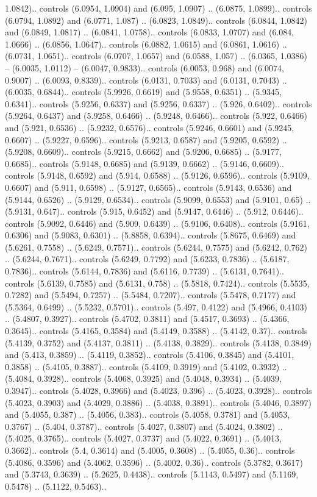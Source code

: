 1.0842).. controls (6.0954, 1.0904) and (6.095, 1.0907) .. (6.0875, 1.0899).. controls (6.0794, 1.0892) and (6.0771, 1.087) .. (6.0823, 1.0849).. controls (6.0844, 1.0842) and (6.0849, 1.0817) .. (6.0841, 1.0758).. controls (6.0833, 1.0707) and (6.084, 1.0666) .. (6.0856, 1.0647).. controls (6.0882, 1.0615) and (6.0861, 1.0616) .. (6.0731, 1.0651).. controls (6.0707, 1.0657) and (6.0588, 1.057) .. (6.0365, 1.0386) -- (6.0035, 1.0112) -- (6.0047, 0.9833).. controls (6.0053, 0.968) and (6.0074, 0.9007) .. (6.0093, 0.8339).. controls (6.0131, 0.7033) and (6.0131, 0.7043) .. (6.0035, 0.6844).. controls (5.9926, 0.6619) and (5.9558, 0.6351) .. (5.9345, 0.6341).. controls (5.9256, 0.6337) and (5.9256, 0.6337) .. (5.926, 0.6402).. controls (5.9264, 0.6437) and (5.9258, 0.6466) .. (5.9248, 0.6466).. controls (5.922, 0.6466) and (5.921, 0.6536) .. (5.9232, 0.6576).. controls (5.9246, 0.6601) and (5.9245, 0.6607) .. (5.9227, 0.6596).. controls (5.9213, 0.6587) and (5.9205, 0.6592) .. (5.9208, 0.6609).. controls (5.9215, 0.6662) and (5.9206, 0.6685) .. (5.9177, 0.6685).. controls (5.9148, 0.6685) and (5.9139, 0.6662) .. (5.9146, 0.6609).. controls (5.9148, 0.6592) and (5.914, 0.6588) .. (5.9126, 0.6596).. controls (5.9109, 0.6607) and (5.911, 0.6598) .. (5.9127, 0.6565).. controls (5.9143, 0.6536) and (5.9144, 0.6526) .. (5.9129, 0.6534).. controls (5.9099, 0.6553) and (5.9101, 0.65) .. (5.9131, 0.647).. controls (5.915, 0.6452) and (5.9147, 0.6446) .. (5.912, 0.6446).. controls (5.9092, 0.6446) and (5.909, 0.6439) .. (5.9106, 0.6408).. controls (5.9161, 0.6306) and (5.9083, 0.6301) .. (5.8858, 0.6394).. controls (5.8675, 0.6469) and (5.6261, 0.7558) .. (5.6249, 0.7571).. controls (5.6244, 0.7575) and (5.6242, 0.762) .. (5.6244, 0.7671).. controls (5.6249, 0.7792) and (5.6233, 0.7836) .. (5.6187, 0.7836).. controls (5.6144, 0.7836) and (5.6116, 0.7739) .. (5.6131, 0.7641).. controls (5.6139, 0.7585) and (5.6131, 0.758) .. (5.5818, 0.7424).. controls (5.5535, 0.7282) and (5.5494, 0.7257) .. (5.5484, 0.7207).. controls (5.5478, 0.7177) and (5.5364, 0.6499) .. (5.5232, 0.5701).. controls (5.497, 0.4122) and (5.4966, 0.4103) .. (5.4807, 0.3927).. controls (5.4702, 0.3811) and (5.4517, 0.3693) .. (5.4366, 0.3645).. controls (5.4165, 0.3584) and (5.4149, 0.3588) .. (5.4142, 0.37).. controls (5.4139, 0.3752) and (5.4137, 0.3811) .. (5.4138, 0.3829).. controls (5.4138, 0.3849) and (5.413, 0.3859) .. (5.4119, 0.3852).. controls (5.4106, 0.3845) and (5.4101, 0.3858) .. (5.4105, 0.3887).. controls (5.4109, 0.3919) and (5.4102, 0.3932) .. (5.4084, 0.3928).. controls (5.4068, 0.3925) and (5.4048, 0.3934) .. (5.4039, 0.3947).. controls (5.4028, 0.3966) and (5.4023, 0.396) .. (5.4023, 0.3928).. controls (5.4023, 0.3903) and (5.4029, 0.3886) .. (5.4038, 0.3891).. controls (5.4046, 0.3897) and (5.4055, 0.387) .. (5.4056, 0.383).. controls (5.4058, 0.3781) and (5.4053, 0.3767) .. (5.404, 0.3787).. controls (5.4027, 0.3807) and (5.4024, 0.3802) .. (5.4025, 0.3765).. controls (5.4027, 0.3737) and (5.4022, 0.3691) .. (5.4013, 0.3662).. controls (5.4, 0.3614) and (5.4005, 0.3608) .. (5.4055, 0.36).. controls (5.4086, 0.3596) and (5.4062, 0.3596) .. (5.4002, 0.36).. controls (5.3782, 0.3617) and (5.3743, 0.3639) .. (5.2625, 0.4438).. controls (5.1143, 0.5497) and (5.1169, 0.5478) .. (5.1122, 0.5463).. 